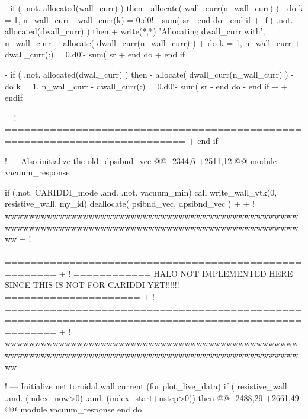 -      if ( .not. allocated(wall_curr) ) then
-        allocate( wall_curr(n_wall_curr) )
-        do k = 1, n_wall_curr
-          wall_curr(k) = 0.d0! - sum( sr%
-        end do
-      end if
+        if ( .not. allocated(dwall_curr) ) then
+          write(*,*) 'Allocating dwall_curr with', n_wall_curr
+          allocate( dwall_curr(n_wall_curr) )
+          do k = 1, n_wall_curr
+            dwall_curr(:) = 0.d0!- sum( sr%
+          end do
+        end if        
       
-      if ( .not. allocated(dwall_curr) ) then
-        allocate( dwall_curr(n_wall_curr) )
-        do k = 1, n_wall_curr
-          dwall_curr(:) = 0.d0!- sum( sr%
-        end do
-      end if         
+
+      endif
       
+      ! ==========================================================================
+       
     end if
     
     ! --- Also initialize the old_dpsibnd_vec
@@ -2344,6 +2511,12 @@ module vacuum_response
 
     if (.not. CARIDDI_mode .and. .not. vacuum_min) call write_wall_vtk(0, resistive_wall, my_id)
     deallocate( psibnd_vec, dpsibnd_vec )
+    
+    ! wwwwwwwwwwwwwwwwwwwwwwwwwwwwwwwwwwwwwwwwwwwwwwwwwwwwwwwwwwwwwwwwwwwwwwwwwwwwwwwwwwwwwwwwwwwwwwwwwwww
+    ! ====================================================================================================
+    ! ============ HALO NOT IMPLEMENTED HERE SINCE THIS IS NOT FOR CARIDDI YET!!!!!! =====================  
+    ! ====================================================================================================
+    ! wwwwwwwwwwwwwwwwwwwwwwwwwwwwwwwwwwwwwwwwwwwwwwwwwwwwwwwwwwwwwwwwwwwwwwwwwwwwwwwwwwwwwwwwwwwwwwwwwwww
 
     ! --- Initialize net toroidal wall current (for plot_live_data)
     if ( resistive_wall .and. (index_now>0) .and. (index_start+nstep>0)) then
@@ -2488,29 +2661,49 @@ module vacuum_response
     end do
 
